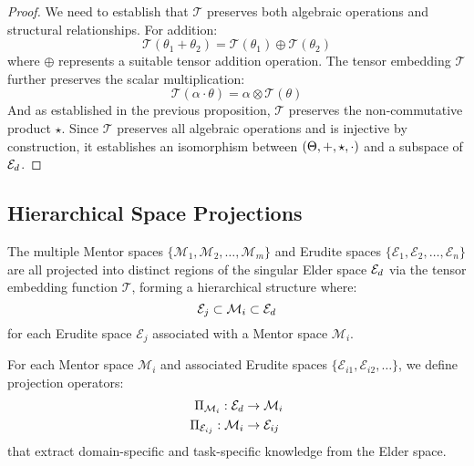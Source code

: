 \begin{proof}
We need to establish that $\mathcal{T}$ preserves both algebraic operations and structural relationships. For addition:
\begin{equation}
\mathcal{T}(\theta_1 + \theta_2) = \mathcal{T}(\theta_1) \oplus \mathcal{T}(\theta_2)
\end{equation}
where $\oplus$ represents a suitable tensor addition operation. The tensor embedding $\mathcal{T}$ further preserves the scalar multiplication:
\begin{equation}
\mathcal{T}(\alpha \cdot \theta) = \alpha \otimes \mathcal{T}(\theta)
\end{equation}
And as established in the previous proposition, $\mathcal{T}$ preserves the non-commutative product $\star$. Since $\mathcal{T}$ preserves all algebraic operations and is injective by construction, it establishes an isomorphism between $(\Theta, +, \star, \cdot)$ and a subspace of $\mathcal{E}_{d}$.
\end{proof}

\subsection{Hierarchical Space Projections}

\begin{corollary}
The multiple Mentor spaces $\{\mathcal{M}_1, \mathcal{M}_2, \ldots, \mathcal{M}_m\}$ and Erudite spaces $\{\mathcal{E}_1, \mathcal{E}_2, \ldots, \mathcal{E}_n\}$ are all projected into distinct regions of the singular Elder space $\mathcal{E}_{d}$ via the tensor embedding function $\mathcal{T}$, forming a hierarchical structure where:
\begin{equation}
\mathcal{E}_j \subset \mathcal{M}_i \subset \mathcal{E}_{d}
\end{equation}
for each Erudite space $\mathcal{E}_j$ associated with a Mentor space $\mathcal{M}_i$.
\end{corollary}

\begin{definition}
For each Mentor space $\mathcal{M}_i$ and associated Erudite spaces $\{\mathcal{E}_{i1}, \mathcal{E}_{i2}, \ldots\}$, we define projection operators:
\begin{align}
\Pi_{\mathcal{M}_i}: \mathcal{E}_{d} &\rightarrow \mathcal{M}_i \\
\Pi_{\mathcal{E}_{ij}}: \mathcal{M}_i &\rightarrow \mathcal{E}_{ij}
\end{align}
that extract domain-specific and task-specific knowledge from the Elder space.
\end{definition}

